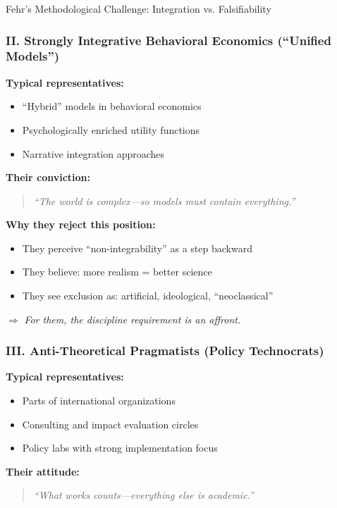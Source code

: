 \begin{chapter}{Fehr's Methodological Challenge: Integration vs. Falsifiability}
\subsubsection{II. Strongly Integrative Behavioral Economics (``Unified Models'')}

\textbf{Typical representatives:}
\begin{itemize}[noitemsep]
    \item ``Hybrid'' models in behavioral economics
    \item Psychologically enriched utility functions
    \item Narrative integration approaches
\end{itemize}

\textbf{Their conviction:}
\begin{quote}
\textit{``The world is complex---so models must contain everything.''}
\end{quote}

\textbf{Why they reject this position:}
\begin{itemize}[noitemsep]
    \item They perceive ``non-integrability'' as a step backward
    \item They believe: more realism = better science
    \item They see exclusion as: artificial, ideological, ``neoclassical''
\end{itemize}

$\Rightarrow$ \textit{For them, the discipline requirement is an affront.}

\subsubsection{III. Anti-Theoretical Pragmatists (Policy Technocrats)}

\textbf{Typical representatives:}
\begin{itemize}[noitemsep]
    \item Parts of international organizations
    \item Consulting and impact evaluation circles
    \item Policy labs with strong implementation focus
\end{itemize}

\textbf{Their attitude:}
\begin{quote}
\textit{``What works counts---everything else is academic.''}
\end{quote}


\end{chapter}
